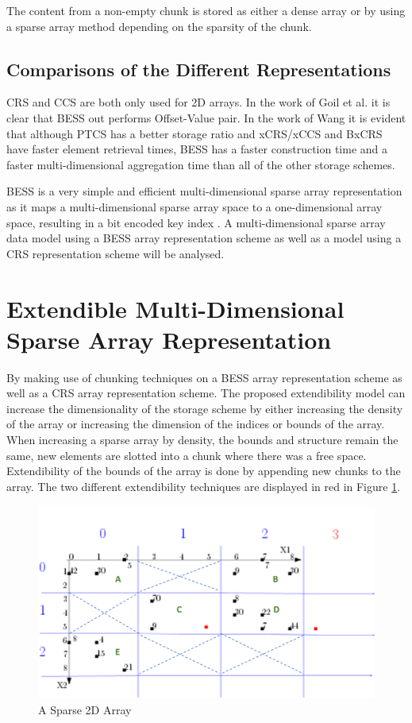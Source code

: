 The content from a non-empty chunk is stored as either a dense array or by using a sparse array method depending on the sparsity of the chunk.

\subsection{Comparisons of the Different Representations}

CRS and CCS are both only used for 2D arrays. In the work of Goil et al. \cite{goil:bess} it is clear that BESS out performs Offset-Value pair. In the work of Wang \cite{wang:2014sar} it is evident that although PTCS has a better storage ratio and xCRS/xCCS and BxCRS have faster element retrieval times, BESS has a faster construction time and a faster multi-dimensional aggregation time than all of the other storage schemes. 

BESS is a very simple and efficient multi-dimensional sparse array representation as it maps a multi-dimensional sparse array space to a one-dimensional array space, resulting in a bit encoded key index \cite{wang:2014sar}. A multi-dimensional sparse array data model using a BESS array representation scheme as well as a model using a CRS representation scheme will be analysed.

\section{Extendible Multi-Dimensional Sparse Array Representation}

 By making use of chunking techniques on a BESS array representation scheme as well as a CRS array representation scheme. The proposed extendibility model can increase the dimensionality of the storage scheme by either increasing the density of the array or increasing the dimension of the indices or bounds of the array. When increasing a sparse array by density, the bounds and structure remain the same, new elements are slotted into a chunk where there was a free space. Extendibility of the bounds of the array is done by appending new chunks to the array. The two different extendibility techniques are displayed in red in Figure \ref{fig:examplemethod}.
 
  \begin{figure}[H]
 	\centering
 	\includegraphics[width=0.7\linewidth]{methodExampleCrossed2}
 	\caption{A Sparse 2D Array}
 	\label{fig:examplemethod}
 \end{figure}

